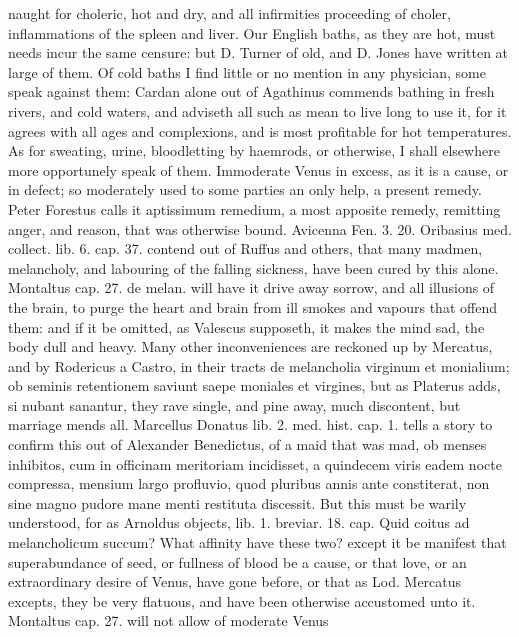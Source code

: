 {naught for choleric, hot and dry, and all infirmities proceeding
of choler, inflammations of the spleen and liver. Our English baths, as
they are hot, must needs incur the same censure: but D. Turner of old,
and D. Jones have written at large of them. Of cold baths I find little
or no mention in any physician, some speak against them: Cardan
alone out of Agathinus commends bathing in fresh rivers, and cold
waters, and adviseth all such as mean to live long to use it, for it
agrees with all ages and complexions, and is most profitable for hot
temperatures. As for sweating, urine, bloodletting by haemrods, or
otherwise, I shall elsewhere more opportunely speak of them.
Immoderate Venus in excess, as it is a cause, or in defect; so
moderately used to some parties an only help, a present remedy. Peter
Forestus calls it aptissimum remedium, a most apposite remedy,
remitting anger, and reason, that was otherwise bound. Avicenna
Fen. 3. 20. Oribasius med. collect. lib. 6. cap. 37. contend out of
Ruffus and others,  that many madmen, melancholy, and labouring
of the falling sickness, have been cured by this alone. Montaltus cap.
27. de melan. will have it drive away sorrow, and all illusions of the
brain, to purge the heart and brain from ill smokes and vapours that
offend them: and if it be omitted, as Valescus supposeth, it
makes the mind sad, the body dull and heavy. Many other inconveniences
are reckoned up by Mercatus, and by Rodericus a Castro, in their tracts
de melancholia virginum et monialium; ob seminis retentionem saviunt
saepe moniales et virgines, but as Platerus adds, si nubant sanantur,
they rave single, and pine away, much discontent, but marriage mends
all. Marcellus Donatus lib. 2. med. hist. cap. 1. tells a story to
confirm this out of Alexander Benedictus, of a maid that was mad, ob
menses inhibitos, cum in officinam meritoriam incidisset, a quindecem
viris eadem nocte compressa, mensium largo profluvio, quod pluribus
annis ante constiterat, non sine magno pudore mane menti restituta
discessit. But this must be warily understood, for as Arnoldus objects,
lib. 1. breviar. 18. cap. Quid coitus ad melancholicum succum? What
affinity have these two? except it be manifest that
superabundance of seed, or fullness of blood be a cause, or that love,
or an extraordinary desire of Venus, have gone before, or that as Lod.
Mercatus excepts, they be very flatuous, and have been otherwise
accustomed unto it. Montaltus cap. 27. will not allow of moderate Venus
}
